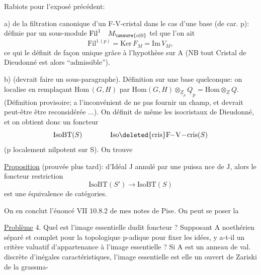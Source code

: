 Rabiots pour l'exposé précédent:

a)  de la filtration canonique d'un F-V-cristal dans le cas d'une base  (de car. p):  définie par un sous-module $\mathrm{Fil}^{1}\quad M_{\unsure{o|0}}$  tel que l'on ait
\[
\mathrm{Fil}^{1\,(p)}=\mathrm{Ker}\,F_M=\mathrm{Im}\,V_M,
\]
ce qui le définit de façon unique grâce à l'hypothèse sur A (NB tout Cristal de Dieudonné est alors ``admissible'').

b)   (devrait faire un sous-paragraphe). Définition sur une base quelconque: on localise  en remplaçant $\mathrm{Hom}\,(G,H)$ par $\mathrm{Hom}(G,H)\otimes_{\underline{Z}_p}\underline{Q}_p=\mathrm{Hom}\otimes_{\underline{Z}}\underline{Q}$. (Définition provisoire;   a l'inconvénient de ne pas fournir un champ, et devrait peut-être être reconsidérée ...). On définit de même les isocristaux de Dieudonné, et on obtient donc un foncteur
\[
\mathrm{IsoBT}(S)\qquad\qquad\mathrm{Iso}\deleted{\mathrm{cris}}\mathrm{F\!\! -\! V\! -\! cris}(S)
\]
(p localement nilpotent sur S). On trouve

\uline{Proposition} (prouvée plus tard):   d'Idéal J annulé par une puissa nce de J, alors le foncteur restriction
\[
\mathrm{IsoBT}(S')\longrightarrow\mathrm{IsoBT}(S)
\]
est une équivalence de catégories.

On en conclut l'énoncé VII 10.8.2 de mes notes de Pise. On peut se poser la 

\uline{Problème} 4. Quel est l'image essentielle dudit foncteur ? Supposant A noethérien séparé et complet pour la topologique p-adique pour fixer les idées, y a-t-il un critère valuatif d'appartenance à l'image essentielle ? Si A est un anneau de val. discrète \deleted{\unsure{(}}d'inégales caractéristiques, l'image essentielle est elle un ouvert de Zariski de la grassma-

